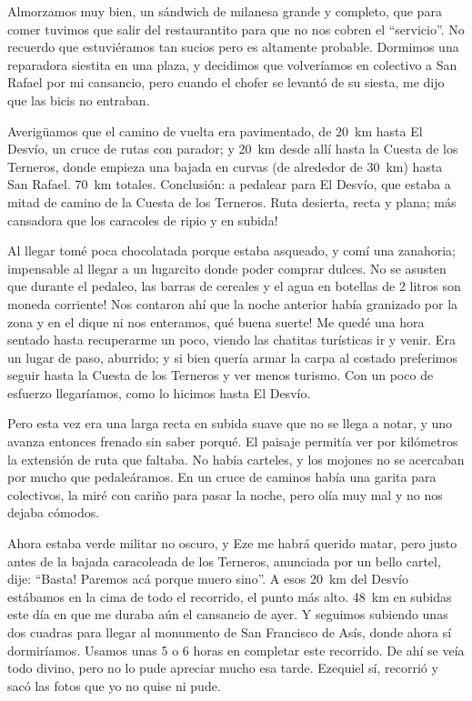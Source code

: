Almorzamos muy bien, un s\'andwich de milanesa grande y completo, que para comer
tuvimos que salir del restaurantito para que no nos cobren el ``servicio''. No
recuerdo que estuvi\'eramos tan sucios pero es altamente probable. Dormimos una
reparadora siestita en una plaza, y decidimos que volver\'iamos en colectivo a
San Rafael por mi cansancio, pero cuando el chofer se levant\'o de su siesta, me
dijo que las bicis no entraban.

Averig\"uamos que el camino de vuelta era pavimentado, de 20~km hasta El
Desv\'io, un cruce de rutas con parador; y 20~km desde all\'i hasta la Cuesta de
los Terneros, donde empieza una bajada en curvas (de alrededor de 30~km) hasta
San Rafael. 70~km totales. Conclusi\'on: a pedalear para El Desv\'io, que estaba
a mitad de camino de la Cuesta de los Terneros. Ruta desierta, recta y plana;
\textexclamdown m\'as cansadora que los caracoles de ripio y en subida!

Al llegar tom\'e poca chocolatada porque estaba asqueado, y com\'i una
zanahoria; impensable al llegar a un lugarcito donde poder comprar dulces.
\textexclamdown No se asusten que durante el pedaleo, las barras de cereales y
el agua en botellas de 2 litros son moneda corriente! Nos contaron ah\'i que la
noche anterior hab\'ia granizado por la zona y en el dique ni nos enteramos,
\textexclamdown qu\'e buena suerte! Me qued\'e una hora sentado hasta
recuperarme un poco, viendo las chatitas tur\'isticas ir y venir. Era un lugar
de paso, aburrido; y si bien quer\'ia armar la carpa al costado preferimos
seguir hasta la Cuesta de los Terneros y ver menos turismo. Con un poco de
esfuerzo llegar\'iamos, como lo hicimos hasta El Desv\'io.

Pero esta vez era una larga recta en subida suave que no se llega a notar, y uno
avanza entonces frenado sin saber porqu\'e. El paisaje permit\'ia ver por
kil\'ometros la extensi\'on de ruta que faltaba. No hab\'ia carteles, y los
mojones no se acercaban por mucho que pedale\'aramos. En un cruce de caminos
hab\'ia una garita para colectivos, la mir\'e con cari\~no para pasar la noche,
pero ol\'ia muy mal y no nos dejaba c\'omodos.

Ahora estaba verde militar no oscuro, y Eze me habr\'a querido matar, pero justo
antes de la bajada caracoleada de los Terneros, anunciada por un bello cartel,
dije: ``\textexclamdown Basta! Paremos ac\'a porque muero sino''. A esos 20~km
del Desv\'io est\'abamos en la cima de todo el recorrido, el punto m\'as alto.
48~km en subidas este d\'ia en que me duraba a\'un el cansancio de ayer. Y
seguimos subiendo unas dos cuadras para llegar al monumento de San Francisco de
As\'is, donde ahora s\'i dormir\'iamos. Usamos unas 5 o 6 horas en completar
este recorrido. De ah\'i se ve\'ia todo divino, pero no lo pude apreciar mucho
esa tarde. Ezequiel s\'i, recorri\'o y sac\'o las fotos que yo no quise ni pude.

